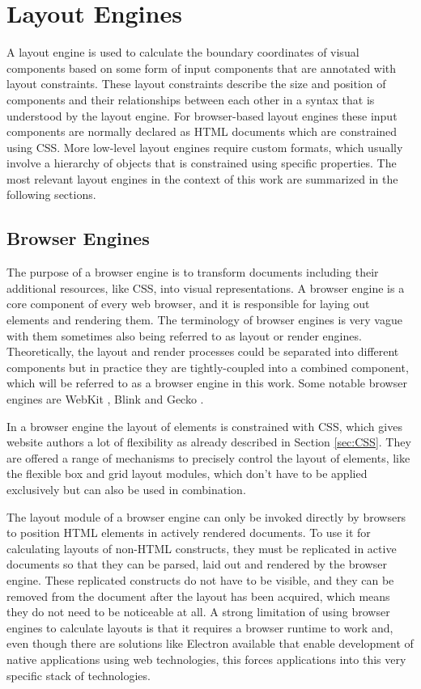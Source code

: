 \section{Layout Engines}

A layout engine is used to calculate the boundary coordinates of visual components based on some form of input components that are annotated with layout constraints. 
These layout constraints describe the size and position of components and their relationships between each other in a syntax that is understood by the layout engine. 
For browser-based layout engines these input components are normally declared as HTML documents which are constrained using CSS. 
More low-level layout engines require custom formats, which usually involve a hierarchy of objects that is constrained using specific properties. 
The most relevant layout engines in the context of this work are summarized in the following sections.

\subsection{Browser Engines}
\label{sec:BrowserEngines}

The purpose of a browser engine is to transform documents including their additional resources, like CSS, into visual representations. 
A browser engine is a core component of every web browser, and it is responsible for laying out elements and rendering them. 
The terminology of browser engines is very vague with them sometimes also being referred to as layout or render engines. 
Theoretically, the layout and render processes could be separated into different components but in practice they are tightly-coupled into a combined component, which will be referred to as a browser engine in this work. 
Some notable browser engines are WebKit \parencite{WebKit}, Blink \parencite{Blink} and Gecko \parencite{Gecko}.

In a browser engine the layout of elements is constrained with CSS, which gives website authors a lot of flexibility as already described in Section \ref{sec:CSS}. 
They are offered a range of mechanisms to precisely control the layout of elements, like the flexible box and grid layout modules, which don't have to be applied exclusively but can also be used in combination. 

The layout module of a browser engine can only be invoked directly by browsers to position HTML elements in actively rendered documents. 
To use it for calculating layouts of non-HTML constructs, they must be replicated in active documents so that they can be parsed, laid out and rendered by the browser engine. 
These replicated constructs do not have to be visible, and they can be removed from the document after the layout has been acquired, which means they do not need to be noticeable at all. 
A strong limitation of using browser engines to calculate layouts is that it requires a browser runtime to work and, even though there are solutions like Electron available that enable development of native applications using web technologies, this forces applications into this very specific stack of technologies. 

